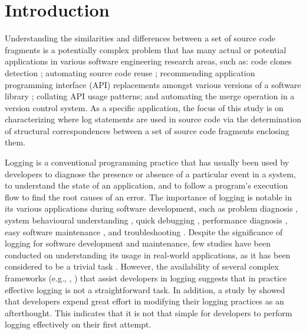\chapter{Introduction}  \label{Introduction}

Understanding the similarities and differences between a set of source code fragments is a potentially complex problem that has many actual or potential applications in various software engineering research areas, such as: code clones detection \cite{2009:iwsc:bulychev}; automating source code reuse \cite{2008:fse:cottrell}; recommending application programming interface (API) replacements amongst various versions of a software library \cite{2014:uofc:cossette}; collating API usage patterns; and automating the merge operation in a version control system. As a specific application, the focus of this study is on characterizing where log statements are used in source code via the determination of structural correspondences between a set of source code fragments enclosing them.

Logging is a conventional programming practice that has usually been used by developers to diagnose the presence or absence of a particular event in a system, to understand the state of an application, and to follow a program's execution flow to find the root causes of an error. The importance of logging is notable in its various applications during software development, such as problem diagnosis \cite{lou2010mining}, system behavioural understanding \cite{fu2013contextual}, quick debugging \cite{gupta2005pro}, performance diagnosis \cite{nagaraj2012structured}, easy software maintenance \cite{gupta2005pro}, and troubleshooting \cite{fu2009execution}. Despite the significance of logging for software development and maintenance, few studies have been conducted on understanding its usage in real-world applications, as it has been considered to be a trivial task \cite{clarke1999dimension,clarke1999subject}. However, the availability of several complex frameworks (e.g., , ) that assist developers in logging suggests that in practice effective logging is not a straightforward task. In addition, a study by \citet{yuan2012characterizing} showed that developers expend great effort in modifying their logging practices as an afterthought. This indicates that it is not that simple for developers to perform logging effectively on their first attempt.

